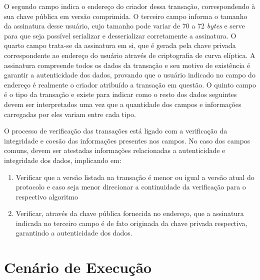 O segundo campo indica o endereço do criador dessa transação, correspondendo à sua chave pública em versão comprimida. O terceiro campo informa o tamanho da assinatura desse usuário, cujo tamanho pode variar de 70 a 72 \textit{bytes} e serve para que seja possível serializar e desserializar corretamente a assinatura. O quarto campo trata-se da assinatura em si, que é gerada pela chave privada correspondente ao endereço do usuário através de criptografia de curva elíptica. A assinatura compreende todos os dados da transação e seu motivo de existência é garantir a autenticidade dos dados, provando que o usuário indicado no campo do endereço é realmente o criador atribuído a transação em questão. O quinto campo é o tipo da transação e existe para indicar como o resto dos dados seguintes devem ser interpretados uma vez que a quantidade dos campos e informações carregadas por eles variam entre cada tipo.

O processo de verificação das transações está ligado com a verificação da integridade e coesão das informações presentes nos campos. No caso dos campos comuns, devem ser atestadas informações relacionadas a autenticidade e integridade dos dados, implicando em:

\begin{enumerate}
    \item Verificar que a versão listada na transação é menor ou igual a versão atual do protocolo e caso seja menor direcionar a continuidade da verificação para o respectivo algoritmo
    \item Verificar, através da chave pública fornecida no endereço, que a assinatura indicada no terceiro campo é de fato originada da chave privada respectiva, garantindo a autenticidade dos dados. 
\end{enumerate}


\section{Cenário de Execução}
\label{sec:cenario_execucao}

